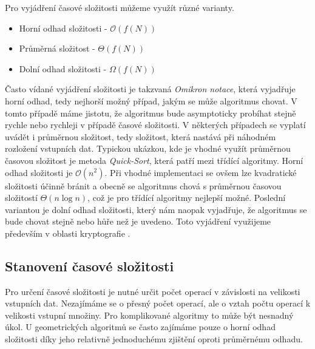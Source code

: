	 Pro vyjádření časové složitosti můžeme využít různé varianty.
\begin{itemize}
	\item Horní odhad složitosti - $\mathcal{O} (f(N))$
	\item Průměrná složitost - $\Theta (f(N))$
	\item Dolní odhad složitosti - $\Omega (f(N))$
\end{itemize}	
	Často vídané vyjádření složitosti je takzvaná \textit{Omikron notace}, která vyjadřuje horní odhad, tedy nejhorší možný případ, jakým se může algoritmus chovat. V tomto případě máme jistotu, že algoritmus bude asymptoticky probíhat stejně rychle nebo rychleji v případě časové složitosti. V některých případech se vyplatí uvádět i průměrnou složitost, tedy složitost, která nastává při náhodném rozložení vstupních dat. Typickou ukázkou, kde je vhodné využít průměrnou časovou složitost je metoda \textit{Quick-Sort}, která patří mezi třídící algoritmy. Horní odhad složitosti je $\mathcal{O}(n^2)$. Při vhodné implementaci se ovšem lze kvadratické složitosti účinně bránit a obecně se algoritmus chová s průměrnou časovou složitostí $\Theta (n \log n)$, což je pro třídící algoritmy nejlepší možné.\cite{wirth1989algoritmy} Poslední variantou je dolní odhad složitosti, který nám naopak vyjadřuje, že algoritmus se bude chovat stejně nebo hůře než je uvedeno. Toto vyjádření využijeme především v oblasti kryptografie \cite{milkova2010algoritmy,bayer2008algoritmy}.
	
\subsection{Stanovení časové složitosti}
	Pro určení časové složitosti je nutné určit počet operací v závislosti na velikosti vstupních dat. Nezajímáme se o přesný počet operací, ale o vztah počtu operací k velikosti vstupní množiny. Pro komplikované algoritmy to může být nesnadný úkol. U geometrických algoritmů se často zajímáme pouze o horní odhad složitosti díky jeho relativně jednoduchému zjištění oproti průměrnému odhadu.
	
